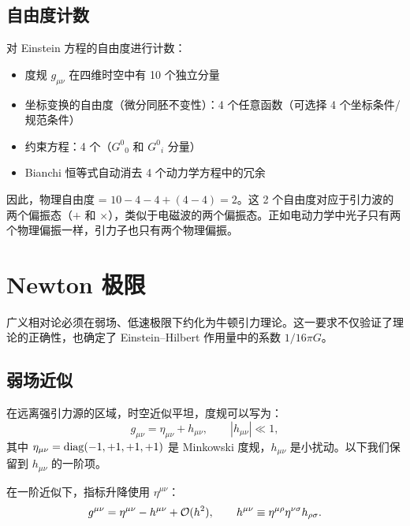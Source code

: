 \subsection{自由度计数}

\begin{property}
对 Einstein 方程的自由度进行计数：
\begin{itemize}
    \item 度规 $g_{\mu\nu}$ 在四维时空中有 10 个独立分量
    \item 坐标变换的自由度（微分同胚不变性）：4 个任意函数（可选择 4 个坐标条件/规范条件）
    \item 约束方程：4 个（$G^0{}_0$ 和 $G^0{}_i$ 分量）
    \item Bianchi 恒等式自动消去 4 个动力学方程中的冗余
\end{itemize}
因此，物理自由度 = $10 - 4 - 4 + (4-4) = 2$。这 2 个自由度对应于引力波的两个偏振态（$+$ 和 $\times$），类似于电磁波的两个偏振态。正如电动力学中光子只有两个物理偏振一样，引力子也只有两个物理偏振。
\end{property}

\section{Newton 极限}
\label{sec:newtonian_limit}

广义相对论必须在弱场、低速极限下约化为牛顿引力理论。这一要求不仅验证了理论的正确性，也确定了 Einstein--Hilbert 作用量中的系数 $1/16\pi G$。

\subsection{弱场近似}

\begin{definition}[弱场度规]
在远离强引力源的区域，时空近似平坦，度规可以写为：
\begin{equation}
    g_{\mu\nu} = \eta_{\mu\nu} + h_{\mu\nu}, \qquad |h_{\mu\nu}| \ll 1,
    \label{eq:weak_field}
\end{equation}
其中 $\eta_{\mu\nu} = \operatorname{diag}(-1, +1, +1, +1)$ 是 Minkowski 度规，$h_{\mu\nu}$ 是小扰动。以下我们保留到 $h_{\mu\nu}$ 的一阶项。
\end{definition}

在一阶近似下，指标升降使用 $\eta^{\mu\nu}$：
\begin{equation}
    g^{\mu\nu} = \eta^{\mu\nu} - h^{\mu\nu} + \mathcal{O}(h^2), \qquad h^{\mu\nu} \equiv \eta^{\mu\rho}\eta^{\nu\sigma} h_{\rho\sigma}.
\end{equation}

